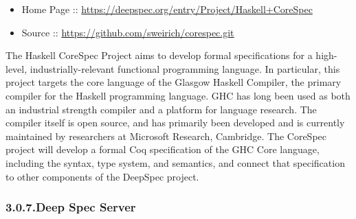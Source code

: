 \documentclass[12pt,twoside]{article}
\begin{document}
\begin{itemize}[noitemsep,topsep=\mdcompacttopsep]%

\item{}Home Page :: \href{https://deepspec.org/entry/Project/Haskell+CoreSpec}{{\ttfamily https://\hspace{0pt}deepspec.\hspace{0pt}org/\hspace{0pt}entry/\hspace{0pt}Project/\hspace{0pt}Haskell+\hspace{0pt}CoreSpec}}%

\item{}Source :: \href{https://github.com/sweirich/corespec.git}{{\ttfamily https://\hspace{0pt}github.\hspace{0pt}com/\hspace{0pt}sweirich/\hspace{0pt}corespec.\hspace{0pt}git}}%
\end{itemize}%

\noindent{}The Haskell CoreSpec Project aims to develop formal specifications for
a high-level, industrially-relevant functional programming
language. In particular, this project targets the core language of the
Glasgow Haskell Compiler, the primary compiler for the Haskell
programming language. GHC has long been used as both an industrial
strength compiler and a platform for language research. The compiler
itself is open source, and has primarily been developed and is
currently maintained by researchers at Microsoft Research,
Cambridge. The CoreSpec project will develop a formal Coq
specification of the GHC Core language, including the syntax, type
system, and semantics, and connect that specification to other
components of the DeepSpec project.%

\subsubsection{3.0.7.\hspace*{0.5em}Deep Spec Server}\label{sec-deep-spec-server}%
\end{document}
